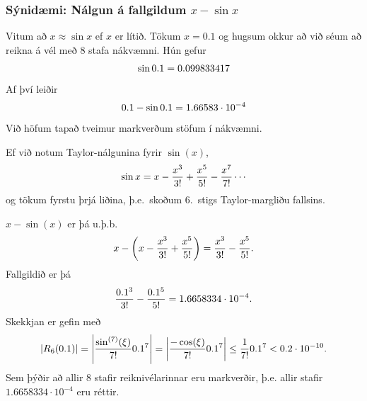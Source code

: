 \documentclass[a4paper,10pt,icelandic]{sphinxmanual}
\begin{document}
\subsubsection{Sýnidæmi: Nálgun á fallgildum \(x-\sin x\)}
\label{kafli01:synidaemi-nalgun-a-fallgildum}
Vitum að \(x \approx \sin x\) ef \(x\) er lítið. Tökum
\(x=0.1\) og hugsum okkur að við séum að reikna á vél með 8 stafa
nákvæmni. Hún gefur
\begin{gather}
\begin{split}\sin 0.1 = 0.099833417\end{split}\notag
\end{gather}
Af því leiðir
\begin{gather}
\begin{split}0.1 - \sin 0.1 = 1.66583\cdot 10^{-4}\end{split}\notag
\end{gather}
Við höfum tapað tveimur markverðum stöfum í nákvæmni.

Ef við notum Taylor-nálgunina fyrir \(\sin(x)\),
\begin{gather}
\begin{split}\sin x = x - \frac{x^3}{3!} + \frac{x^5}{5!}
    - \frac{x^7}{7!} \cdots\end{split}\notag
\end{gather}
og tökum fyrstu þrjá liðina, þ.e. skoðum 6. stigs Taylor-margliðu
fallsins.

\(x-\sin(x)\) er þá u.þ.b.
\begin{gather}
\begin{split}x - \left(x - \frac{x^3}{3!} + \frac{x^5}{5!}\right) = \frac{x^3}{3!} - \frac{x^5}{5!}.\end{split}\notag
\end{gather}
Fallgildið er þá
\begin{gather}
\begin{split}\frac {0.1^3}{3!} - \frac{0.1^5}{5!} = 1.6658334 \cdot 10^{-4}.\end{split}\notag
\end{gather}
Skekkjan er gefin með
\begin{gather}
\begin{split}|R_6(0.1)| = \left|\frac{\sin^{(7)}(\xi)}{7!}0.1^7\right|
    = \left|\frac{-\cos(\xi)}{7!}0.1^7\right|
    \leq \frac{1}{7!}0.1^7 < 0.2\cdot 10^{-10}.\end{split}\notag
\end{gather}
Sem þýðir að allir 8 stafir reiknivélarinnar eru markverðir, þ.e.
allir stafir \(1.6658334 \cdot 10^{-4}\) eru réttir.
\end{document}
